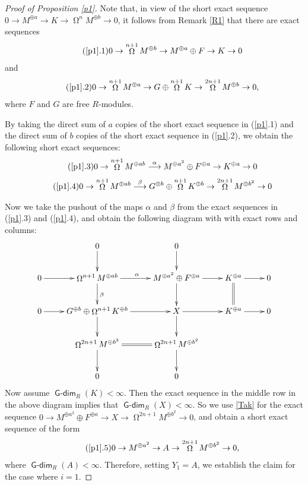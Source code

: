 \documentclass{amsart}
\theoremstyle{plain} %
\theoremstyle{definition}
\DeclareMathOperator{\Gdim}{\mathsf{G-dim}}
\DeclareMathOperator{\syz}{\Omega}
\begin{document}
\begin{proof} [Proof of Proposition \ref{p1}] Note that, in view of the short exact sequence $0\to M^{\oplus a} \to K \to \syz^{n} M^{\oplus b} \to 0$, it follows from Remark \ref{R1} that there are exact sequences
\begin{align}\tag{\ref{p1}.1}
0 \to \syz^{n+1}M^{\oplus b} \to M^{\oplus a}\oplus F \to K \to 0 
\end{align}
and
\begin{align} \tag{\ref{p1}.2}
0 \to \syz^{n+1}M^{\oplus a} \to G \oplus \syz^{n+1}K \to \syz^{2n+1}M^{\oplus b} \to 0,
\end{align}
where $F$ and $G$ are free $R$-modules.

By taking the direct sum of $a$ copies of the short exact sequence in (\ref{p1}.1) and the direct sum of $b$ copies of the short exact sequence in (\ref{p1}.2), we obtain the following short exact sequences:
\begin{align}\tag{\ref{p1}.3}
0 \to \syz^{n+1}M^{\oplus ab} \stackrel{\alpha}
     {\longrightarrow} M^{\oplus a^2}\oplus F^{\oplus a} \to K^{\oplus a} \to 0 
\end{align}
\begin{align} \tag{\ref{p1}.4}
0 \to \syz^{n+1}M^{\oplus ab} \stackrel{\beta}
     {\longrightarrow}  G^{\oplus b} \oplus \syz^{n+1}K^{\oplus b} \to \syz^{2n+1}M^{\oplus b^2} \to 0
\end{align}

Now we take the pushout of the maps $\alpha$ and $\beta$ from the exact sequences in (\ref{p1}.3) and (\ref{p1}.4), and obtain the following diagram with with exact rows and columns:
\[
\xymatrix{
& 0 \ar[d] & 0 \ar[d] & & \\
0 \ar[r] & \syz^{n+1}M^{\oplus ab} \ar[r]^{\alpha} \ar[d]^{\beta} & M^{\oplus a^{2}}\oplus F^{\oplus a} \ar[r] \ar[d] & K^{\oplus a} \ar[r] \ar@{=}[d] & 0\\
0 \ar[r] & G^{\oplus b}  \oplus \syz^{n+1}K^{\oplus b} \ar[r] \ar[d] & X \ar[r] \ar[d] & K^{\oplus a} \ar[r] & 0\\
& \syz^{2n+1}M^{\oplus b^2} \ar[d] \ar@{=}[r] & \syz^{2n+1}M^{\oplus b^2} \ar[d] & &\\
& 0 & 0 & &
}
\]
Now assume $\Gdim_R(K)<\infty$. Then the exact sequence in the middle row in the above diagram implies that $\Gdim_R(X)<\infty$. So we use \ref{Tak} for the exact sequence $0 \to M^{\oplus a^2}\oplus F^{\oplus a} \to X \to \syz^{2n+1} M^{\oplus b^2} \to 0$, and obtain a short exact sequence of the form
\begin{align} \tag{\ref{p1}.5}
0 \to M^{\oplus a^{2}} \to A \to \syz^{2n+1} M^{\oplus b^{2}} \to 0,
\end{align}
where $\Gdim_R(A)<\infty$. Therefore, setting $Y_1=A$, we establish the claim for the case where $i=1$.


\end{proof}
\end{document}
